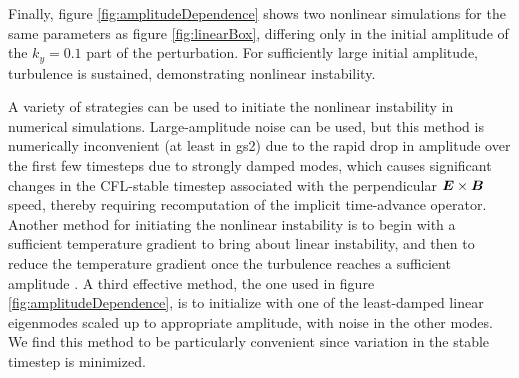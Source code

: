 \documentclass[12pt,superscriptaddress]{revtex4}
\newcommand{\vect}[1]{\mbox{\boldmath $#1$}}
\begin{document}
Finally, figure \ref{fig:amplitudeDependence} shows two nonlinear simulations for the same parameters as figure \ref{fig:linearBox},
differing only in the initial amplitude of the $k_y=0.1$ part of the perturbation.
For sufficiently large initial amplitude, turbulence is sustained,
demonstrating nonlinear instability.

A variety of strategies can be used to initiate the nonlinear instability in numerical simulations.
Large-amplitude noise can be used, but this method is numerically inconvenient (at least in gs2) due to the rapid
drop in amplitude over the first few timesteps due to strongly damped modes,
which causes significant changes in the CFL-stable timestep associated
with the perpendicular $\vect{E}\times\vect{B}$ speed,
thereby requiring recomputation of the implicit time-advance operator.
Another method for initiating the nonlinear instability is to begin with a sufficient
temperature gradient to bring about linear instability, and then to reduce the temperature gradient
once the turbulence reaches a sufficient amplitude \cite{Drake}.
A third effective method, the one used in figure \ref{fig:amplitudeDependence},
is to initialize with one of the least-damped linear eigenmodes scaled up to appropriate amplitude, with noise in the other modes.  We find this method to be particularly convenient since variation in the stable timestep
is minimized.
\end{document}
